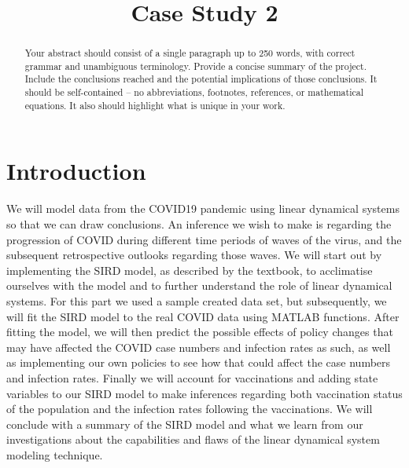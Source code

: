 \documentclass[conference]{IEEEtran}
\begin{document}
\title{Case Study 2}

\author{
\and
{}
\and
{}
}

\maketitle

\begin{abstract}
Your abstract should consist of a single paragraph up to 250 words, with correct grammar and unambiguous terminology. Provide a concise summary of the project. Include the conclusions reached and the potential implications of those conclusions. It should be self-contained -- no abbreviations, footnotes, references, or mathematical equations. It also should highlight what is unique in your work.
\end{abstract}


\section{Introduction}
We will model data from the COVID19 pandemic using linear dynamical systems so that we can draw conclusions. An inference we wish to make is regarding the progression of COVID during different time periods of waves of the virus, and the subsequent retrospective outlooks regarding those waves. We will start out by implementing the SIRD model, as described by the textbook, to acclimatise ourselves with the model and to further understand  the role of linear dynamical systems. For this part we used a sample created data set, but subsequently, we will fit the SIRD model to the real COVID data using MATLAB functions. After fitting the model, we will then predict the possible effects of policy changes that may have affected the COVID case numbers and infection rates as such, as well as implementing our own policies to see how that could affect the case numbers and infection rates. Finally we will account for vaccinations and adding state variables to our SIRD model to make inferences regarding both vaccination status of the population and the infection rates following the vaccinations. We will conclude with a summary of the SIRD model and what we learn from our investigations about the capabilities and flaws of the linear dynamical system modeling technique.
\end{document}
